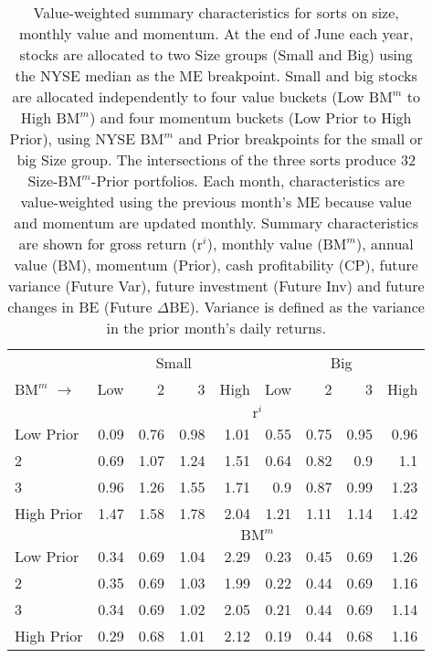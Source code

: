 
\begin{table}[!ht]
\scriptsize
\centering
\caption{
\scriptsize{
Value-weighted summary characteristics for sorts on size, monthly value and
momentum.
At the end of June each year, stocks are allocated to two Size groups
(Small and Big) using the NYSE median as the ME breakpoint.
Small and big stocks are allocated independently to four value buckets (Low
$\text{BM}^m$ to High $\text{BM}^m$) and four momentum buckets
(Low Prior to High Prior), using NYSE $\text{BM}^m$ and Prior breakpoints for
the small or big Size group.
The intersections of the three sorts produce 32 Size-$\text{BM}^m$-Prior
portfolios.
Each month, characteristics are value-weighted using the previous month's ME
because value and momentum are updated monthly.
Summary characteristics are shown for
gross return ($\text{r}^i$),
monthly value ($\text{BM}^m$),
annual value (BM),
momentum (Prior),
cash profitability (CP),
future variance (Future Var),
future investment (Future Inv) and
future changes in BE (Future $\Delta$BE).
Variance is defined as the variance in the prior month's daily returns.
}
}
\begin{tabular}{lrrrrrrrr}
  \toprule
     & \multicolumn{4}{c}{Small} & \multicolumn{4}{c}{Big}  \\
     \cmidrule(r){2-5} \cmidrule(r){6-9}
    $\text{BM}^m$ $\rightarrow$ & Low & 2 & 3 & High & Low & 2 & 3 & High  \\ 
  \midrule
  
  
    & \multicolumn{8}{c}{$\text{r}^i$}  \\
     \cmidrule(r){2-5} \cmidrule(r){6-9}
    Low Prior  & 0.09  & 0.76  & 0.98  & 1.01  & 0.55  & 0.75  & 0.95  & 0.96   \\
    2  & 0.69  & 1.07  & 1.24  & 1.51  & 0.64  & 0.82  & 0.9  & 1.1   \\
    3  & 0.96  & 1.26  & 1.55  & 1.71  & 0.9  & 0.87  & 0.99  & 1.23   \\
    High Prior  & 1.47  & 1.58  & 1.78  & 2.04  & 1.21  & 1.11  & 1.14  & 1.42   \\
    
  
    & \multicolumn{8}{c}{$\text{BM}^m$}  \\
     \cmidrule(r){2-5} \cmidrule(r){6-9}
    Low Prior  & 0.34  & 0.69  & 1.04  & 2.29  & 0.23  & 0.45  & 0.69  & 1.26   \\
    2  & 0.35  & 0.69  & 1.03  & 1.99  & 0.22  & 0.44  & 0.69  & 1.16   \\
    3  & 0.34  & 0.69  & 1.02  & 2.05  & 0.21  & 0.44  & 0.69  & 1.14   \\
    High Prior  & 0.29  & 0.68  & 1.01  & 2.12  & 0.19  & 0.44  & 0.68  & 1.16   \\
    

\end{tabular}
\end{table}
